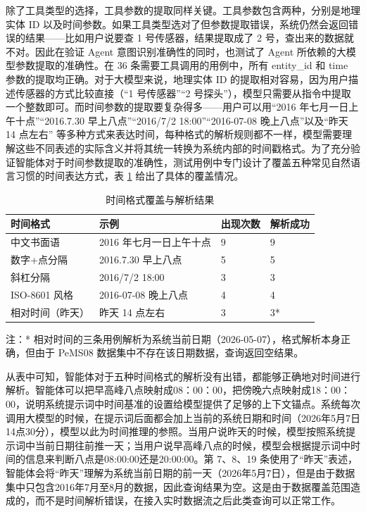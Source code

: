 除了工具类型的选择，工具参数的提取同样关键。工具参数包含两种，分别是地理实体 ID 以及时间参数。如果工具类型选对了但参数提取错误，系统仍然会返回错误的结果——比如用户说要查 1 号传感器，结果提取成了 2 号，查出来的数据就不对。因此在验证 Agent 意图识别准确性的同时，也测试了 Agent 所依赖的大模型参数提取的准确性。在 36 条需要工具调用的用例中，所有 entity\_id 和 time 参数的提取均正确。对于大模型来说，地理实体 ID 的提取相对容易，因为用户描述传感器的方式比较直接（“1 号传感器”“2 号探头”），模型只需要从指令中提取一个整数即可。而时间参数的提取要复杂得多——用户可以用“2016 年七月一日上午十点”“2016.7.30 早上八点”“2016/7/2 18:00”“2016-07-08 晚上八点”以及“昨天 14 点左右” 等多种方式来表达时间，每种格式的解析规则都不一样，模型需要理解这些不同表述的实际含义并将其统一转换为系统内部的时间戳格式。为了充分验证智能体对于时间参数提取的准确性，测试用例中专门设计了覆盖五种常见自然语言习惯的时间表达方式，表 \ref{tab:time-format} 给出了具体的覆盖情况。

\begin{table}[!htbp]
\centering
\caption{时间格式覆盖与解析结果}
\label{tab:time-format}
\begin{tabular}{p{4cm}p{4cm}p{2cm}p{2cm}}
\toprule
\textbf{时间格式} & \textbf{示例} & \textbf{出现次数} & \textbf{解析成功} \\
\midrule
中文书面语 & 2016 年七月一日上午十点 & 9 & 9 \\
数字+点分隔 & 2016.7.30 早上八点 & 5 & 5 \\
斜杠分隔 & 2016/7/2 18:00 & 3 & 3 \\
ISO-8601 风格 & 2016-07-08 晚上八点 & 4 & 4 \\
相对时间（昨天） & 昨天 14 点左右 & 3 & 3* \\
\bottomrule
\end{tabular}

\vspace{0.5em}
{\small 注：* 相对时间的三条用例解析为系统当前日期（2026-05-07），格式解析本身正确，但由于 PeMS08 数据集中不存在该日期数据，查询返回空结果。}
\end{table}

从表中可知，智能体对于五种时间格式的解析没有出错，都能够正确地对时间进行解析。智能体可以把早高峰八点映射成08：00：00，把傍晚六点映射成18：00：00，说明系统提示词中时间基准的设置给模型提供了足够的上下文锚点。系统每次调用大模型的时候，在提示词后面都会加上当前的系统日期和时间（2026年5月7日14点30分），模型以此为时间推理的参照。当用户说昨天的时候，模型按照系统提示词中当前日期往前推一天；当用户说早高峰八点的时候，模型会根据提示词中时间的信息来判断八点是08:00:00还是20:00:00。第 7、8、19 条使用了“昨天”表述，智能体会将“昨天”理解为系统当前日期的前一天（2026年5月7日），但是由于数据集中只包含2016年7月至8月的数据，因此查询结果为空。这是由于数据覆盖范围造成的，而不是时间解析错误，在接入实时数据流之后此类查询可以正常工作。

